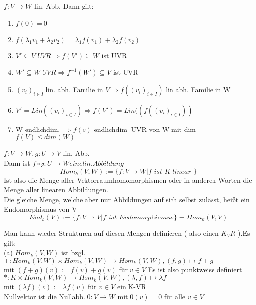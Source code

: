 \documentclass[headsepline,12pt,a4paper]{scrartcl}
\makeatletter
\def\myItem{%
   \@ifnextchar[ \@myItem{\@noitemargtrue\@myItem[\@itemlabel]}}
\def\@myItem[#1]{\item[#1]\mbox{}\\}
\makeatother
\begin{document}
\newpage

\myItem[Bemerkung 12.3] $f:V \rightarrow W$ lin. Abb. 
Dann gilt: \\
\begin{enumerate}
\item $f(0)=0$ \\
\item $f(\lambda_1 v_1+ \lambda_2 v_2)= \lambda_1 f(v_1) + \lambda_2 f(v_2)$ \\
\item $ V' \subseteq V \; UVR \Rightarrow f(V') \subseteq W $ ist UVR \\
\item $W'\subseteq W \; UVR \Rightarrow f^{-1} (W') \subseteq V$ ist UVR \\
\item $(v_i)_{i \in I}$ lin. abh. Familie in $V \Rightarrow f((v_i)_{i \in I})$ lin abh.
Familie in W \\
\item $V' = Lin((v_i)_{i \in I}) \Rightarrow f(V')=Lin((f((v_i)_{i \in I}))$ \\
\item W endlichdim. $\Rightarrow f(v)$ endlichdim. UVR von W mit dim$f(V) \leq dim(W)$ 
\end{enumerate}

\myItem[Bemerkung 12.4]$f:V \rightarrow W, g:U\rightarrow V$ lin. Abb.\\
Dann ist $f\circ g:U \rightarrow W eine lin. Abbildung$ \\

\myItem[Def. 12.5]
$$Hom_k (V,W):=\{f: V \rightarrow W| f \textit{ ist K-linear }\}$$ 
Ist also die Menge aller Vektorraumhomomorphismen oder in anderen Worten die Menge aller linearen Abbildungen. \\
Die gleiche Menge, welche aber nur Abbildungen auf sich selbst zulässt, heißt ein Endomorphismus von V\\
$$End_k (V):=\{f:V \rightarrow V| \textit{f ist Endomorphismus} \} = Hom_k (V,V)$$

\myItem[12.6] Man kann wieder Strukturen auf diesen Mengen definieren ( also einen $K_VR$ ).Es gilt: \\
(a) $Hom_k (V,W)$ ist bzgl. \\
$+:Hom_k (V,W) \times Hom_k (V,W) \rightarrow Hom_k (V,W), (f,g) \mapsto f+g $\\
mit $(f+g)(v):=f(v)+g(v) $ für $v\in  V$ Es ist also punktweise definiert \\ 
$*:K \times Hom_k (V,W) \rightarrow Hom_k (V,W), (\lambda,f)\mapsto \lambda f$ \\
mit $(\lambda f)(v):= \lambda f(v)$ für $v\in V$ ein K-VR \\
Nullvektor ist die Nullabb. $0: V\rightarrow W $ mit $0(v)=0$ für alle $v\in V$ \\
\end{document}
